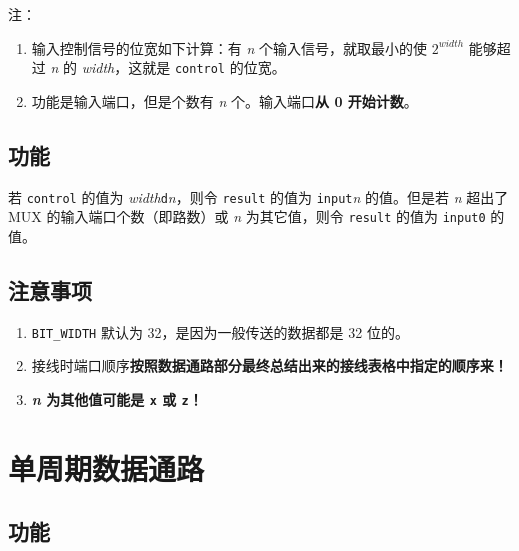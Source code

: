 \documentclass[12pt,AutoFakeBold]{article}
\providecommand{\tightlist}{%
  \setlength{\itemsep}{0pt}\setlength{\parskip}{0pt}}
\begin{document}
注：

\begin{enumerate}
\def\labelenumi{\arabic{enumi}.}
\tightlist
\item
  输入控制信号的位宽如下计算：有 \emph{n} 个输入信号，就取最小的使
  \emph{$2^{width}$} 能够超过 \emph{n} 的 \emph{width}，这就是
  \texttt{control} 的位宽。
\item
  功能是输入端口，但是个数有 \emph{n} 个。输入端口\textbf{从 0
  开始计数}。
\end{enumerate}

\hypertarget{ux529fux80fd-10}{%
\subsection{功能}\label{ux529fux80fd-10}}

若 \texttt{control} 的值为
\emph{width}\texttt{\textquotesingle{}d}\emph{n}，则令 \texttt{result}
的值为 \texttt{input}\emph{n} 的值。但是若 \emph{n} 超出了 MUX
的输入端口个数（即路数）或 \emph{n} 为其它值，则令 \texttt{result}
的值为 \texttt{input0} 的值。

\hypertarget{ux6ce8ux610fux4e8bux9879-6}{%
\subsection{注意事项}\label{ux6ce8ux610fux4e8bux9879-6}}

\begin{enumerate}
\def\labelenumi{\arabic{enumi}.}
\tightlist
\item
  \texttt{BIT\_WIDTH} 默认为 32，是因为一般传送的数据都是 32 位的。
\item
  接线时端口顺序\textbf{按照数据通路部分最终总结出来的接线表格中指定的顺序来！}
\item
  \textbf{\emph{n} 为其他值可能是 \texttt{x} 或 \texttt{z}！}
\end{enumerate}

\hypertarget{ux5355ux5468ux671fux6570ux636eux901aux8def}{%
\section{单周期数据通路}\label{ux5355ux5468ux671fux6570ux636eux901aux8def}}

\hypertarget{ux529fux80fd-11}{%
\subsection{功能}\label{ux529fux80fd-11}}
\end{document}
